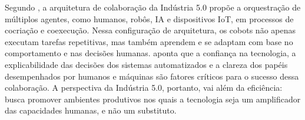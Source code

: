 Segundo , a arquitetura de colaboração da Indústria 5.0 propõe a orquestração de múltiplos agentes, como humanos, robôs, \gls{IA} e dispositivos \gls{IoT}, em processos de cocriação e coexecução.
Nessa configuração de arquitetura, os cobots não apenas executam tarefas repetitivas, mas também aprendem e se adaptam com base no comportamento e nas decisões humanas.
 aponta que a confiança na tecnologia, a explicabilidade das decisões dos sistemas automatizados e a clareza dos papéis desempenhados por humanos e máquinas são fatores críticos para o sucesso dessa colaboração.
A perspectiva da Indústria 5.0, portanto, vai além da eficiência: busca promover ambientes produtivos nos quais a tecnologia seja um amplificador das capacidades humanas, e não um substituto.


